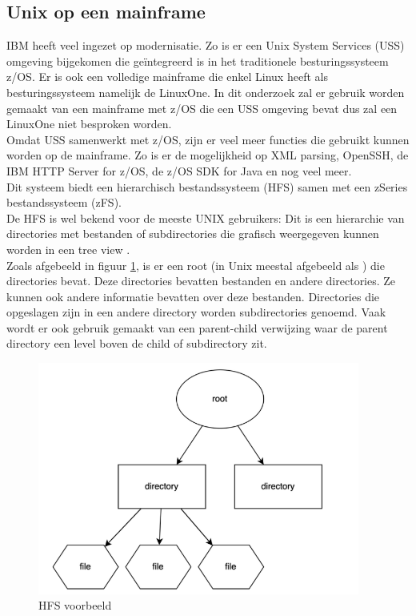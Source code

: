 \subsection{Unix op een mainframe}
IBM heeft veel ingezet op modernisatie. Zo is er een Unix System Services (USS) omgeving bijgekomen die geïntegreerd is in het traditionele besturingssysteem z/OS. Er is ook een volledige mainframe die enkel Linux heeft als besturingssysteem namelijk de LinuxOne. In dit onderzoek zal er gebruik worden gemaakt van een mainframe met z/OS die een USS omgeving bevat dus zal een LinuxOne niet besproken worden. \\

Omdat USS samenwerkt met z/OS, zijn er veel meer functies die gebruikt kunnen worden op de mainframe. Zo is er de mogelijkheid op XML parsing, OpenSSH, de IBM HTTP Server for z/OS, de z/OS SDK for Java en nog veel meer. \autocite{Dhawan2013} \\
 
Dit systeem biedt een hierarchisch bestandssysteem (HFS) samen met een zSeries bestandssysteem (zFS). \autocite{Precisely2020} \\ De HFS is wel bekend voor de meeste UNIX gebruikers: Dit is een hierarchie van directories met bestanden of subdirectories die grafisch weergegeven kunnen worden in een tree view \autocite{HCLTechnologies2022}. \\ 

Zoals afgebeeld in figuur \ref{fig:HFS}, is er een root (in Unix meestal afgebeeld als \textquote{/}) die directories bevat. Deze directories bevatten bestanden en andere directories. Ze kunnen ook andere informatie bevatten over deze bestanden. Directories die opgeslagen zijn in een andere directory worden subdirectories genoemd. Vaak wordt er ook gebruik gemaakt van een parent-child verwijzing waar de parent directory een level boven de child of subdirectory zit. \autocite{Codecadamy2022} \\

\begin{figure}[pt!]
    \centering
    \includegraphics[width=300pt]{./graphics/HFS.png}
    \caption{HFS voorbeeld \autocite{Codecadamy2022}}
    \label{fig:HFS}
\end{figure}

